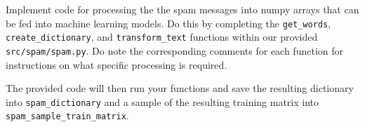 \item {}
Implement code for processing the the spam messages into numpy arrays that can be fed into machine learning models. Do this by completing the \texttt{get\_words}, \texttt{create\_dictionary}, and \texttt{transform\_text} functions within our provided \texttt{src/spam/spam.py}. Do note the corresponding comments for each function for instructions on what specific processing is required.

The provided code will then run your functions and save the resulting dictionary into \texttt{spam\_dictionary} and a sample of the resulting training matrix into\\
\texttt{spam\_sample\_train\_matrix}.\\[50pt]